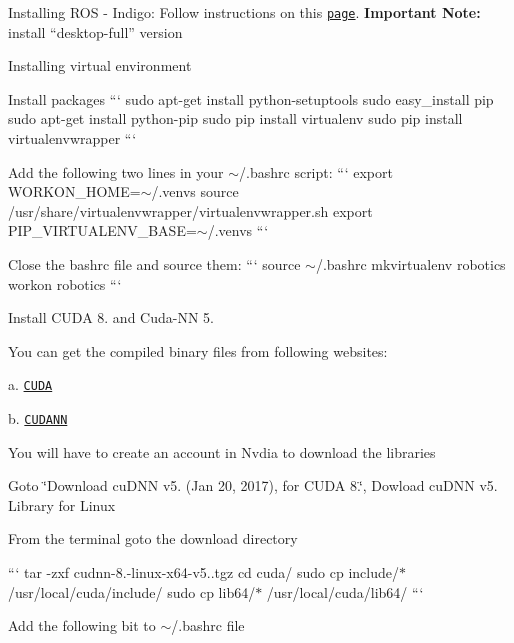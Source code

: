\begin{DoxyEnumerate}
\item Installing R\-O\-S -\/ Indigo\-: Follow instructions on this \href{http://wiki.ros.org/indigo/Installation/Ubuntu}{\tt page}. {\bfseries Important Note\-:} install “desktop-\/full” version
\item Installing virtual environment
\begin{DoxyItemize}
\item Install packages ``` sudo apt-\/get install python-\/setuptools sudo easy\-\_\-install pip sudo apt-\/get install python-\/pip sudo pip install virtualenv sudo pip install virtualenvwrapper ```
\item Add the following two lines in your $\sim$/.bashrc script\-: ``` export W\-O\-R\-K\-O\-N\-\_\-\-H\-O\-M\-E=$\sim$/.venvs source /usr/share/virtualenvwrapper/virtualenvwrapper.sh export P\-I\-P\-\_\-\-V\-I\-R\-T\-U\-A\-L\-E\-N\-V\-\_\-\-B\-A\-S\-E=$\sim$/.venvs ```
\item Close the bashrc file and source them\-: ``` source $\sim$/.bashrc mkvirtualenv robotics workon robotics ```
\end{DoxyItemize}
\item Install C\-U\-D\-A 8. and Cuda-\/\-N\-N 5.

You can get the compiled binary files from following websites\-:

a. \href{https://developer.nvidia.com/cuda-downloads}{\tt C\-U\-D\-A}

b. \href{https://developer.nvidia.com/cudnn}{\tt C\-U\-D\-A\-N\-N}
\begin{DoxyItemize}
\item You will have to create an account in Nvdia to download the libraries
\item Goto \char`\"{}\-Download cu\-D\-N\-N v5. (\-Jan 20, 2017), for C\-U\-D\-A 8.\char`\"{}, Dowload cu\-D\-N\-N v5. Library for Linux
\item From the terminal goto the download directory

``` tar -\/zxf cudnn-\/8.-\/linux-\/x64-\/v5..\-tgz cd cuda/ sudo cp include/$\ast$ /usr/local/cuda/include/ sudo cp lib64/$\ast$ /usr/local/cuda/lib64/ ```
\item Add the following bit to $\sim$/.bashrc file


\end{DoxyItemize}
\end{DoxyEnumerate}
